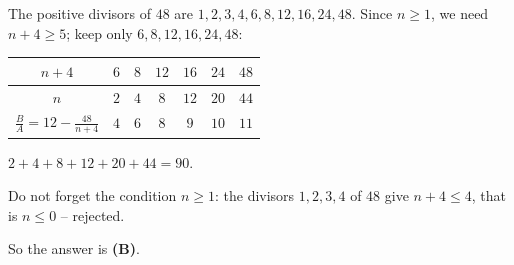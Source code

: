 {
The positive divisors of $48$ are $1,2,3,4,6,8,12,16,24,48$. Since $n\ge 1$, we need $n+4\ge 5$; keep only $6,8,12,16,24,48$:
\begin{center}
\begin{tabular}{|c|c|c|c|c|c|c|}
\hline
\rowcolor{tmBlue!10}$n+4$ & $6$ & $8$ & $12$ & $16$ & $24$ & $48$\\ \hline
$n$ & $2$ & $4$ & $8$ & $12$ & $20$ & $44$\\ \hline
$\frac{B}{A}=12-\frac{48}{n+4}$ & $4$ & $6$ & $8$ & $9$ & $10$ & $11$\\ \hline
\end{tabular}
\end{center}

$2+4+8+12+20+44=90$.
\begin{warnbox}Do not forget the condition $n\ge 1$: the divisors $1,2,3,4$ of $48$ give $n+4\le 4$, that is $n\le 0$ -- rejected.\end{warnbox}
So the answer is \textbf{(B)}.
}

